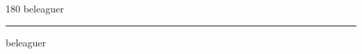 
\begin{frame}
\begin{center}
\begin{turn}{180}
{\fontsize{2.5cm}{1em}\selectfont beleaguer}
\end{turn}
\vspace{1em}\par  
\hrule
\vspace{1em}\par  
{\fontsize{2.5cm}{1em}\selectfont beleaguer}
\end{center}
\end{frame}
